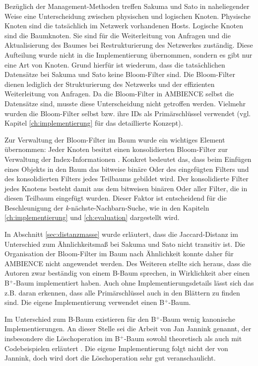 Bezüglich der Management-Methoden treffen Sakuma und Sato in naheliegender Weise eine Unterscheidung zwischen physischen und logischen Knoten. Physische Knoten sind die tatsächlich im Netzwerk vorhandenen Hosts. Logische Knoten sind die Baumknoten. Sie sind für die Weiterleitung von Anfragen und die Aktualisierung des Baumes bei Restrukturierung des Netzwerkes zuständig. Diese Aufteilung wurde nicht in die Implementierung übernommen, sondern es gibt nur eine Art von Knoten. Grund hierfür ist wiederum, dass die tatsächlichen Datensätze bei Sakuma und Sato keine Bloom-Filter sind. Die Bloom-Filter dienen lediglich der Strukturierung des Netzwerks und der effizienten Weiterleitung von Anfragen. Da die Bloom-Filter in AMBIENCE selbst die Datensätze sind, musste diese Unterscheidung nicht getroffen werden. Vielmehr wurden die Bloom-Filter selbst bzw. ihre IDs als Primärschlüssel verwendet (vgl. Kapitel \ref{ch:implementierung} für das detaillierte Konzept). 

Zur Verwaltung der Bloom-Filter im Baum wurde ein wichtiges Element übernommen: Jeder Knoten besitzt einen konsolidierten Bloom-Filter zur Verwaltung der Index-Informationen \cite{Sakuma2011}. Konkret bedeutet das, dass beim Einfügen eines Objekts in den Baum das bitweise binäre Oder des eingefügten Filters und des konsolidierten Filters jedes Teilbaums gebildet wird. Der konsolidierte Filter jedes Knotens besteht damit aus dem bitweisen binären Oder aller Filter, die in diesen Teilbaum eingefügt wurden. Dieser Faktor ist entscheidend für die Beschleunigung der \textit{k}-nächste-Nachbarn-Suche, wie in den Kapiteln \ref{ch:implementierung} und \ref{ch:evaluation} dargestellt wird. 

In Abschnitt \ref{sec:distanzmasse} wurde erläutert, dass die Jaccard-Distanz im Unterschied zum Ähnlichkeitsmaß bei Sakuma und Sato nicht transitiv ist. Die Organisation der Bloom-Filter im Baum nach Ähnlichkeit konnte daher für AMBIENCE nicht angewendet werden. Des Weiteren stellte sich heraus, dass die Autoren zwar beständig von einem B-Baum sprechen, in Wirklichkeit aber einen B$^+$-Baum implementiert haben. Auch ohne Implementierungsdetails lässt sich das z.B. daran erkennen, dass alle Primärschlüssel auch in den Blättern zu finden sind. Die eigene Implementierung verwendet einen B$^+$-Baum. 

Im Unterschied zum B-Baum existieren für den B$^+$-Baum wenig kanonische Implementierungen. An dieser Stelle sei die Arbeit von Jan Jannink genannt, der insbesondere die Löschoperation im B$^+$-Baum sowohl theoretisch als auch mit Codebeispielen erläutert \cite{Jannink1995}. Die eigene Implementierung folgt nicht der von Jannink, doch wird dort die Löschoperation sehr gut veranschaulicht. 
